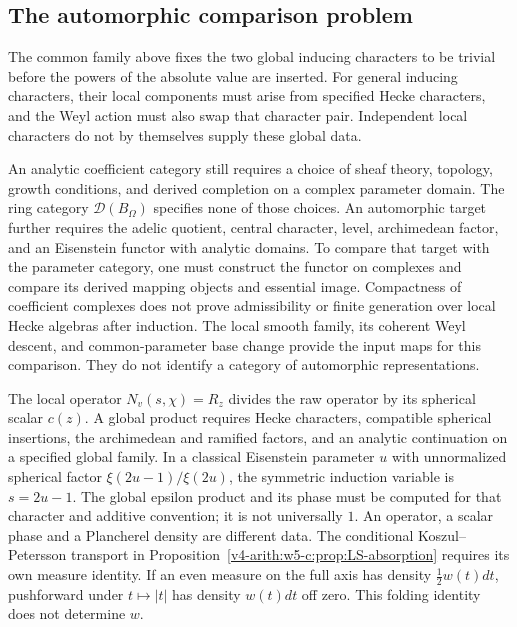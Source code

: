 \subsection{The automorphic comparison problem}

The common family above fixes the two global inducing characters to be trivial
before the powers of the absolute value are inserted.
For general inducing characters, their local components must arise from
specified Hecke characters, and the Weyl action must also swap that character pair.
Independent local characters do not by themselves supply these global data.

An analytic coefficient category still requires a choice of sheaf theory,
topology, growth conditions, and derived completion on a complex parameter domain.
The ring category $\mathcal D(B_\Omega)$ specifies none of those choices.
An automorphic target further requires the adelic quotient, central character,
level, archimedean factor, and an Eisenstein functor with analytic domains.
To compare that target with the parameter category, one must construct
the functor on complexes and compare its derived mapping objects and essential image.
Compactness of coefficient complexes does not prove admissibility or
finite generation over local Hecke algebras after induction.
The local smooth family, its coherent Weyl descent, and common-parameter
base change provide the input maps for this comparison.
They do not identify a category of automorphic representations.



\begin{remark}
\label{v4-arith:w6-d:rem:W6C-relation}
The local operator $N_v(s,\chi)=R_z$ divides the raw operator by its
spherical scalar $c(z)$. A global product requires Hecke characters,
compatible spherical insertions, the archimedean and ramified factors,
and an analytic continuation on a specified global family.
In a classical Eisenstein parameter $u$ with unnormalized spherical
factor $\xi(2u-1)/\xi(2u)$, the symmetric induction variable is
$s=2u-1$. The global epsilon product and its phase must be computed for
that character and additive convention; it is not universally $1$.
An operator, a scalar phase and a Plancherel density are different data.
The conditional Koszul--Petersson transport in
Proposition~\ref{v4-arith:w5-c:prop:LS-absorption} requires its own
measure identity. If an even measure on the full axis has density
$\tfrac12 w(t)dt$, pushforward under $t\mapsto|t|$ has density
$w(t)dt$ off zero. This folding identity does not determine $w$.
\end{remark}

